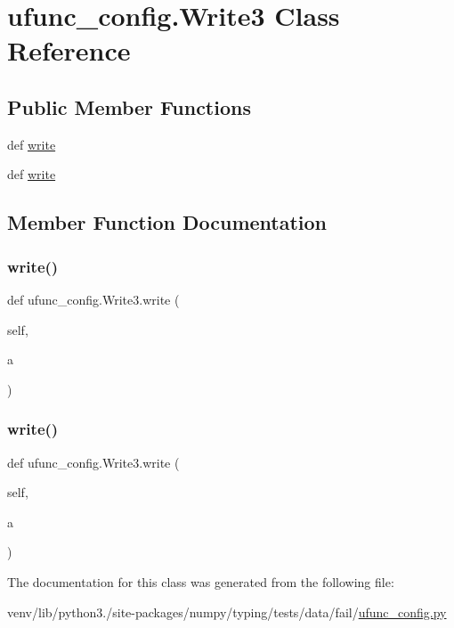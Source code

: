 \hypertarget{classufunc__config_1_1Write3}{}\section{ufunc\+\_\+config.\+Write3 Class Reference}
\label{classufunc__config_1_1Write3}
\subsection*{Public Member Functions}
\begin{DoxyCompactItemize}
\item 
def \hyperlink{classufunc__config_1_1Write3_a9072099364f88c5a29fa1e20d8b78b93}{write}
\item 
def \hyperlink{classufunc__config_1_1Write3_a9072099364f88c5a29fa1e20d8b78b93}{write}
\end{DoxyCompactItemize}


\subsection{Member Function Documentation}
\mbox{\label{classufunc__config_1_1Write3_a9072099364f88c5a29fa1e20d8b78b93}} 
\subsubsection{\texorpdfstring{write()}{write()}\hspace{0.1cm}{\footnotesize\ttfamily [1/2]}}
{\footnotesize\ttfamily def ufunc\+\_\+config.\+Write3.\+write (\begin{DoxyParamCaption}\item[{}]{self,  }\item[{}]{a }\end{DoxyParamCaption})}

\mbox{\label{classufunc__config_1_1Write3_a9072099364f88c5a29fa1e20d8b78b93}} 
\subsubsection{\texorpdfstring{write()}{write()}\hspace{0.1cm}{\footnotesize\ttfamily [2/2]}}
{\footnotesize\ttfamily def ufunc\+\_\+config.\+Write3.\+write (\begin{DoxyParamCaption}\item[{}]{self,  }\item[{}]{a }\end{DoxyParamCaption})}



The documentation for this class was generated from the following file\+:\begin{DoxyCompactItemize}
\item 
venv/lib/python3./site-\/packages/numpy/typing/tests/data/fail/\hyperlink{fail_2ufunc__config_8py}{ufunc\+\_\+config.\+py}\end{DoxyCompactItemize}
